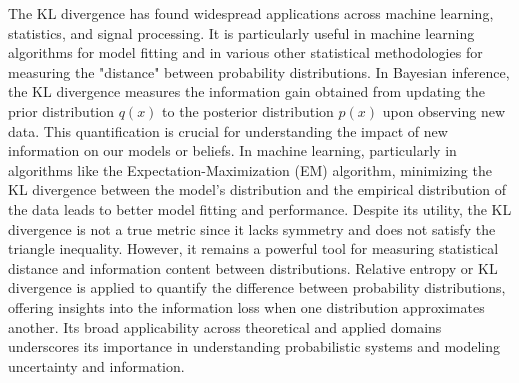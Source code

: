 \documentclass[12pt]{article}
\begin{document}
		The KL divergence has found widespread applications across machine learning, statistics, and signal processing. It is particularly useful  in machine learning algorithms for model fitting and in various other statistical methodologies for measuring the "distance" between probability distributions. In Bayesian inference, the KL divergence measures the information gain obtained from updating the prior distribution \(q(x)\) to the posterior distribution \(p(x)\) upon observing new data. This quantification is crucial for understanding the impact of new information on our models or beliefs. In machine learning, particularly in algorithms like the Expectation-Maximization (EM) algorithm, minimizing the KL divergence between the model's distribution and the empirical distribution of the data leads to better model fitting and performance. Despite its utility, the KL divergence is not a true metric since it lacks symmetry and does not satisfy the triangle inequality. However, it remains a powerful tool for measuring statistical distance and information content between distributions. Relative entropy or KL divergence is applied to quantify the difference between probability distributions, offering insights into the information loss when one distribution approximates another. Its broad applicability across theoretical and applied domains underscores its importance in understanding probabilistic systems and modeling uncertainty and information.
		
		
		
		
\end{document}
